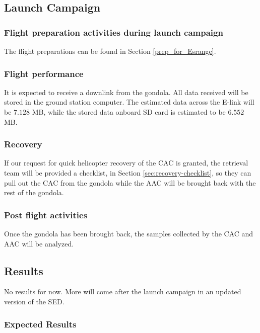 \documentclass[a4paper,12pt,twoside]{article}
\begin{document}
\pagebreak
\subsection{Launch Campaign}
\subsubsection{Flight preparation activities during launch campaign} %
The flight preparations can be found in Section \ref{prep_for_Esrange}.

\subsubsection{Flight performance}
It is expected to receive a downlink from the gondola. All data received will be stored in the ground station computer. The estimated data across the E-link will be $7.128$ MB, while the stored data onboard SD card is estimated to be $6.552$ MB.

\subsubsection{Recovery}
If our request for quick helicopter recovery of the CAC is granted, the retrieval team will be provided a checklist, in Section \ref{sec:recovery-checklist}, so they can pull out the CAC from the gondola while the AAC will be brought back with the rest of the gondola.

\subsubsection{Post flight activities}
Once the gondola has been brought back, the samples collected by the CAC and AAC will be analyzed.

\subsection{Results}

No results for now. More will come after the launch campaign in an updated version of the SED. 

\subsubsection{Expected Results}
\end{document}
